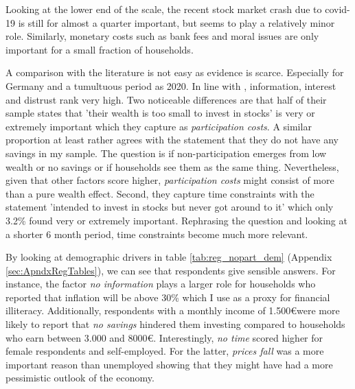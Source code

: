 \documentclass[ProjectABM]{subfiles}
\begin{document}

Looking at the lower end of the scale, the recent stock market crash due to covid-19 is still for almost a quarter important, but seems to play a relatively minor role. Similarly, monetary costs such as bank fees and moral issues are only important for a small fraction of households.



A comparison with the literature is not easy as evidence is scarce. Especially for Germany and a tumultuous period as 2020. In line with \cite{choi_2020}, information, interest and distrust rank very high. Two noticeable differences are that half of their sample states that 'their wealth is too small to invest in stocks' is very or extremely important which they capture as \textit{participation costs}. A similar proportion at least rather agrees with the statement that they do not have any savings in my sample. The question is if non-participation emerges from low wealth or no savings or if households see them as the same thing. Nevertheless, given that other factors score higher, \textit{participation costs} might consist of more than a pure wealth effect. Second, they capture time constraints with the statement 'intended to invest in stocks but never got around to it' which only 3.2\% found very or extremely important. Rephrasing the question and looking at a shorter 6 month period, time constraints become much more relevant.


By looking at demographic drivers in table \ref{tab:reg_nopart_dem} (Appendix \ref{sec:ApndxRegTables}), we can see that respondents give sensible answers. For instance, the factor \textit{no information} plays a larger role for households who reported that inflation will be above 30\% which I use as a proxy for financial illiteracy. Additionally, respondents with a monthly income of 1.500\euro were more likely to report that \textit{no savings} hindered them investing compared to households who earn between 3.000 and 8000\euro. Interestingly, \textit{no time} scored higher for female respondents and self-employed. For the latter, \textit{prices fall} was a more important reason than unemployed showing that they might have had a more pessimistic outlook of the economy.
\end{document}
